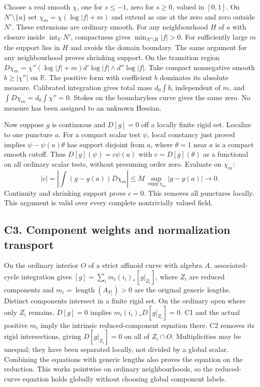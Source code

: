 \documentclass[
  10pt,
]{article}
\begin{document}
Choose a real smooth \(\chi\), one for \(s\leq-1\), zero for \(s\geq0\),
valued in \([0,1]\). On \(N'\setminus\{a\}\) set
\(\chi_m=\chi(\log|f|+m)\) and extend as one at the zero and zero
outside \(N'\). These extensions are ordinary smooth. For any
neighbourhood \(H\) of \(a\) with closure inside
\(\operatorname{int}_V N'\), compactness gives
\(\min_{N'\setminus H}|f|>0\). For sufficiently large \(m\) the support
lies in \(H\) and avoids the domain boundary. The same argument for any
neighbourhood proves shrinking support. On the transition region
\(D\chi_m=\chi''(\log|f|+m)d'\log|f|\wedge d''\log|f|\). Take compact
nonnegative smooth \(b\geq|\chi''|\) on \(\mathbb R\). The positive form
with coefficient \(b\) dominates its absolute measure. Calibrated
integration gives total mass \(d_0\int b\), independent of \(m\), and
\(\int D\chi_m=d_0\int\chi''=0\). Stokes on the boundaryless curve gives
the same zero. No measure has been assigned to an unknown Hessian.

Now suppose \(g\) is continuous and \(D[g]=0\) off a locally finite
rigid set. Localize to one puncture \(a\). For a compact scalar test
\(\psi\), local constancy just proved implies \(\psi-\psi(a)\theta\) has
support disjoint from \(a\), where \(\theta=1\) near \(a\) is a compact
smooth cutoff. Thus \(D[g](\psi)=c\psi(a)\) with \(c=D[g](\theta)\) as a
functional on all ordinary scalar tests, without presuming order zero.
Evaluate on \(\chi_m\): \[
 |c|=\left|\int(g-g(a))D\chi_m\right|
 \leq M\sup_{\operatorname{supp}\chi_m}|g-g(a)|\longrightarrow0.
\] Continuity and shrinking support prove \(c=0\). This removes all
punctures locally. This argument is valid over every complete
nontrivially valued field.

\subsection{C3. Component weights and normalization
transport}\label{c3.-component-weights-and-normalization-transport}

On the ordinary interior \(O\) of a strict affinoid curve with algebra
\(A\), associated-cycle integration gives
\([g]=\sum_i m_i(i_i)_*[g|_{Z_i}]\), where \(Z_i\) are reduced
components and \(m_i=\operatorname{length}(A_{P_i})>0\) are the original
generic lengths. Distinct components intersect in a finite rigid set. On
the ordinary open where only \(Z_i\) remains, \(D[g]=0\) implies
\(m_i(i_i)_*D[g|_{Z_i}]=0\). C1 and the actual positive \(m_i\) imply
the intrinsic reduced-component equation there. C2 removes its rigid
intersections, giving \(D[g|_{Z_i}]=0\) on all of \(Z_i\cap O\).
Multiplicities may be unequal; they have been separated locally, not
divided by a global scalar. Combining the equations with generic lengths
also proves the equation on the reduction. This works pointwise on
ordinary neighbourhoods, so the reduced-curve equation holds globally
without choosing global component labels.
\end{document}
